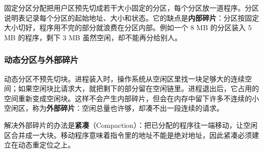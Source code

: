 固定分区分配把用户区预先切成若干大小固定的分区，每个分区放一道程序。分区说明表记录每个分区的起始地址、大小和状态。它的缺点是\textbf{内部碎片}：分区按固定大小切好，程序用不完的部分就浪费在分区内部。例如一个 8 MB 的分区装入 5 MB 的程序，剩下 3 MB 虽然空闲，却不能再分给别人。

\subsubsection{动态分区与外部碎片}

动态分区不预先切块。进程装入时，操作系统从空闲区里找一块足够大的连续空间；如果空闲块比请求大，就把剩下的部分留在空闲链里。进程退出后，它占用的空间重新变成空闲块。这样不会产生内部碎片，但会在内存中留下许多不连续的小空闲区，称为\textbf{外部碎片}：空闲总量也许够，却凑不出一段连续的请求。

解决外部碎片的办法是\textbf{紧凑}（Compaction）：把已分配的程序往一端移动，让空闲区合并成一大块。移动程序意味着指令里的地址不能是绝对地址，因此紧凑必须建立在动态重定位之上。

